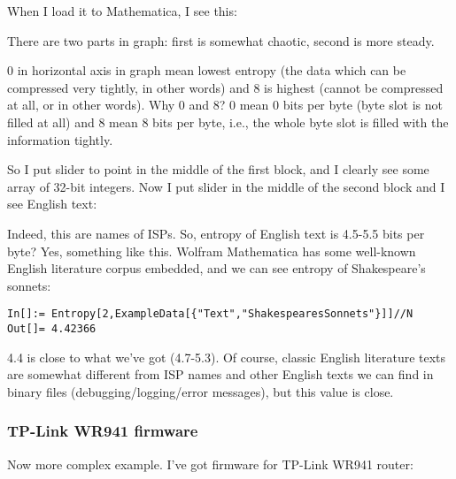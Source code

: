 When I load it to Mathematica, I see this:

\begin{figure}[H]
\centering
{}
\end{figure}

There are two parts in graph: first is somewhat chaotic, second is more steady.

0 in horizontal axis in graph mean lowest entropy (the data which can be compressed very tightly,  in other words) 
and 8 is highest (cannot be compressed at all,  or  in other words).
Why 0 and 8? 0 mean 0 bits per byte (byte slot is not filled at all) 
and 8 mean 8 bits per byte, i.e., the whole byte slot is filled with the information tightly.

So I put slider to point in the middle of the first block, and I clearly see some array of 32-bit integers.
Now I put slider in the middle of the second block and I see English text:

\begin{figure}[H]
\centering
{}
\end{figure}

Indeed, this are names of ISPs.
So, entropy of English text is 4.5-5.5 bits per byte? Yes, something like this.
Wolfram Mathematica has some well-known English literature corpus embedded, and we can see entropy of Shakespeare's sonnets:

\begin{lstlisting}
In[]:= Entropy[2,ExampleData[{"Text","ShakespearesSonnets"}]]//N
Out[]= 4.42366
\end{lstlisting}

4.4 is close to what we've got (4.7-5.3). 
Of course, classic English literature texts are somewhat different from ISP names and other English texts we can find in binary files 
(debugging/logging/error messages), but this value is close.

\subsubsection{TP-Link WR941 firmware}

Now more complex example. I've got firmware for TP-Link WR941 router:

\begin{figure}[H]
\centering
{}
\end{figure}

